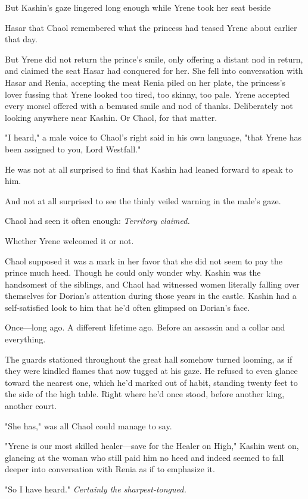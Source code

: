 But Kashin's gaze lingered long enough while Yrene took her seat beside

Hasar that Chaol remembered what the princess had teased Yrene about earlier that day.

But Yrene did not return the prince's smile, only offering a distant nod in return, and claimed the seat Hasar had conquered for her. She fell into conversation with Hasar and Renia, accepting the meat Renia piled on her plate, the princess's lover fussing that Yrene looked too tired, too skinny, too pale. Yrene accepted every morsel offered with a bemused smile and nod of thanks. Deliberately not looking anywhere near Kashin. Or Chaol, for that matter.

"I heard," a male voice to Chaol's right said in his own language, "that Yrene has been assigned to you, Lord Westfall."

He was not at all surprised to find that Kashin had leaned forward to speak to him.

And not at all surprised to see the thinly veiled warning in the male's gaze.

Chaol had seen it often enough: \emph{Territory claimed.}

Whether Yrene welcomed it or not.

Chaol supposed it was a mark in her favor that she did not seem to pay the prince much heed. Though he could only wonder why. Kashin was the handsomest of the siblings, and Chaol had witnessed women literally falling over themselves for Dorian's attention during those years in the castle. Kashin had a self-satisfied look to him that he'd often glimpsed on Dorian's face.

Once---long ago. A different lifetime ago. Before an assassin and a collar and everything.

The guards stationed throughout the great hall somehow turned looming, as if they were kindled flames that now tugged at his gaze. He refused to even glance toward the nearest one, which he'd marked out of habit, standing twenty feet to the side of the high table. Right where he'd once stood, before another king, another court.

"She has," was all Chaol could manage to say.

"Yrene is our most skilled healer---save for the Healer on High," Kashin went on, glancing at the woman who still paid him no heed and indeed seemed to fall deeper into conversation with Renia as if to emphasize it.

"So I have heard." \emph{Certainly the sharpest-tongued.}

